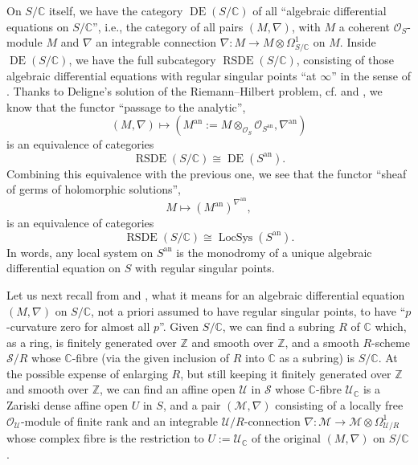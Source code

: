 On \(S/\mathbb{C}\) itself, we have the category \(\operatorname{DE}(S/\mathbb{C})\) of all ``algebraic differential equations on \(S/\mathbb{C}\)'', i.e., the category of all pairs \((M,\nabla)\), with \(M\) a coherent \(\mathcal{O}_S\)-module \(M\) and \(\nabla\) an integrable connection \(\nabla:M\to M\otimes\Omega^1_{S/\mathbb{C}}\) on \(M\). Inside \(\operatorname{DE}(S/\mathbb{C})\), we have the full subcategory \(\operatorname{RSDE}(S/\mathbb{C})\), consisting of those algebraic differential equations with regular singular points ``at \(\infty\)'' in the sense of \cite{De-ED}. Thanks to Deligne's solution of the Riemann--Hilbert problem, cf. \cite{De-ED} and \cite{Ka-ODW23}, we know that the functor ``passage to the analytic'',
\[
(M,\nabla)\mapsto(M^{\mathrm{an}}:=M\otimes_{\mathcal{O}_S}\mathcal{O}_{S^{\mathrm{an}}},\nabla^{\mathrm{an}})
\]
is an equivalence of categories
\[
\operatorname{RSDE}(S/\mathbb{C})\cong\operatorname{DE}(S^{\mathrm{an}}).
\]
Combining this equivalence with the previous one, we see that the functor ``sheaf of germs of holomorphic solutions'',
\[
M\mapsto(M^{\mathrm{an}})^{\nabla^{\mathrm{an}}},
\]
is an equivalence of categories
\[
\operatorname{RSDE}(S/\mathbb{C})\cong\operatorname{LocSys}(S^{\mathrm{an}}).
\]
In words, any local system on \(S^{\mathrm{an}}\) is the monodromy of a unique algebraic differential equation on \(S\) with regular singular points.

Let us next recall from \cite{Ka-NCMT} and \cite[Introduction]{Ka-ASDE}, what it means for an algebraic differential equation \((M,\nabla)\) on \(S/\mathbb{C}\), not a priori assumed to have regular singular points, to have ``\(p\)-curvature zero for almost all \(p\)''. Given \(S/\mathbb{C}\), we can find a subring \(R\) of \(\mathbb{C}\) which, as a ring, is finitely generated over \(\mathbb{Z}\) and smooth over \(\mathbb{Z}\), and a smooth \(R\)-scheme \(\mathcal{S}/R\) whose \(\mathbb{C}\)-fibre (via the given inclusion of \(R\) into \(\mathbb{C}\) as a subring) is \(S/\mathbb{C}\). At the possible expense of enlarging \(R\), but still keeping it finitely generated over \(\mathbb{Z}\) and smooth over \(\mathbb{Z}\), we can find an affine open \(\mathcal{U}\) in \(\mathcal{S}\) whose \(\mathbb{C}\)-fibre \(\mathcal{U}_{\mathbb{C}}\) is a Zariski dense affine open \(U\) in \(S\), and a pair \((\mathcal{M},\nabla)\) consisting of a locally free \(\mathcal{O}_{\mathcal{U}}\)-module of finite rank and an integrable \(\mathcal{U}/R\)-connection \(\nabla:\mathcal{M}\to\mathcal{M}\otimes\Omega^1_{\mathcal{U}/R}\) whose complex fibre is the restriction to \(U:=\mathcal{U}_{\mathbb{C}}\) of the original \((M,\nabla)\) on \(S/\mathbb{C}\).

